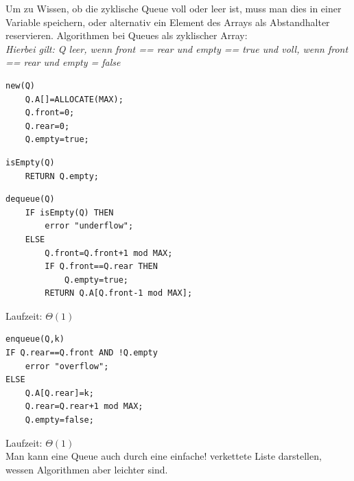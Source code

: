 \documentclass{article}
\begin{document}
            Um zu Wissen, ob die zyklische Queue voll oder leer ist, muss man dies in einer Variable speichern, oder alternativ ein Element des Arrays als Abstandhalter reservieren.
            Algorithmen bei Queues als zyklischer Array: \\
            \textit{Hierbei gilt: Q leer, wenn front == rear und empty == true und voll, wenn front == rear und empty = false}\\
            \begin{lstlisting}[style=pseudocode]
new(Q)
    Q.A[]=ALLOCATE(MAX);
    Q.front=0;
    Q.rear=0;
    Q.empty=true;
            \end{lstlisting}
            \begin{lstlisting}[style=pseudocode]
isEmpty(Q)
    RETURN Q.empty;
            \end{lstlisting}
            \begin{lstlisting}[style=pseudocode]
dequeue(Q)
    IF isEmpty(Q) THEN
        error "underflow";
    ELSE
        Q.front=Q.front+1 mod MAX;
        IF Q.front==Q.rear THEN
            Q.empty=true;
        RETURN Q.A[Q.front-1 mod MAX];
            \end{lstlisting}
            Laufzeit: $\Theta(1)$
            \begin{lstlisting}[style=pseudocode]
enqueue(Q,k)
IF Q.rear==Q.front AND !Q.empty
    error "overflow";
ELSE
    Q.A[Q.rear]=k;
    Q.rear=Q.rear+1 mod MAX;
    Q.empty=false;
            \end{lstlisting}
            Laufzeit: $\Theta(1)$\\
            Man kann eine Queue auch durch eine einfache! verkettete Liste darstellen, wessen Algorithmen aber leichter sind.
\end{document}
